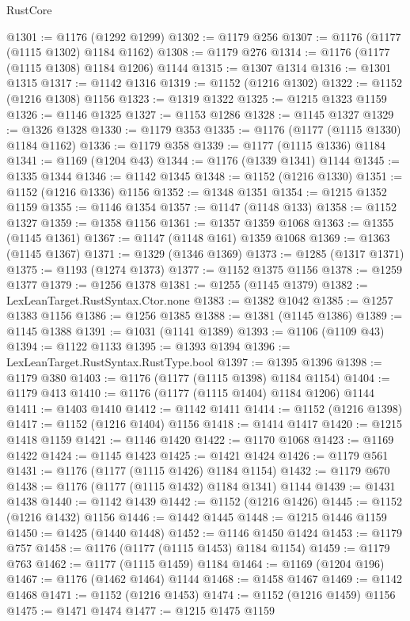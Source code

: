 \begin{lexlean}{RustCore}
\begin{coremodule}
@1301 := @1176 (@1292 @1299)
@1302 := @1179 @256
@1307 := @1176 (@1177 (@1115 @1302) @1184 @1162)
@1308 := @1179 @276
@1314 := @1176 (@1177 (@1115 @1308) @1184 @1206) @1144
@1315 := @1307 @1314
@1316 := @1301 @1315
@1317 := @1142 @1316
@1319 := @1152 (@1216 @1302)
@1322 := @1152 (@1216 @1308) @1156
@1323 := @1319 @1322
@1325 := @1215 @1323 @1159
@1326 := @1146 @1325
@1327 := @1153 @1286
@1328 := @1145 @1327
@1329 := @1326 @1328
@1330 := @1179 @353
@1335 := @1176 (@1177 (@1115 @1330) @1184 @1162)
@1336 := @1179 @358
@1339 := @1177 (@1115 @1336) @1184
@1341 := @1169 (@1204 @43)
@1344 := @1176 (@1339 @1341) @1144
@1345 := @1335 @1344
@1346 := @1142 @1345
@1348 := @1152 (@1216 @1330)
@1351 := @1152 (@1216 @1336) @1156
@1352 := @1348 @1351
@1354 := @1215 @1352 @1159
@1355 := @1146 @1354
@1357 := @1147 (@1148 @133)
@1358 := @1152 @1327
@1359 := @1358 @1156
@1361 := @1357 @1359 @1068
@1363 := @1355 (@1145 @1361)
@1367 := @1147 (@1148 @161) @1359 @1068
@1369 := @1363 (@1145 @1367)
@1371 := @1329 (@1346 @1369)
@1373 := @1285 (@1317 @1371)
@1375 := @1193 (@1274 @1373)
@1377 := @1152 @1375 @1156
@1378 := @1259 @1377
@1379 := @1256 @1378
@1381 := @1255 (@1145 @1379)
@1382 := LexLeanTarget.RustSyntax.Ctor.none
@1383 := @1382 @1042
@1385 := @1257 @1383 @1156
@1386 := @1256 @1385
@1388 := @1381 (@1145 @1386)
@1389 := @1145 @1388
@1391 := @1031 (@1141 @1389)
@1393 := @1106 (@1109 @43)
@1394 := @1122 @1133
@1395 := @1393 @1394
@1396 := LexLeanTarget.RustSyntax.RustType.bool
@1397 := @1395 @1396
@1398 := @1179 @380
@1403 := @1176 (@1177 (@1115 @1398) @1184 @1154)
@1404 := @1179 @413
@1410 := @1176 (@1177 (@1115 @1404) @1184 @1206) @1144
@1411 := @1403 @1410
@1412 := @1142 @1411
@1414 := @1152 (@1216 @1398)
@1417 := @1152 (@1216 @1404) @1156
@1418 := @1414 @1417
@1420 := @1215 @1418 @1159
@1421 := @1146 @1420
@1422 := @1170 @1068
@1423 := @1169 @1422
@1424 := @1145 @1423
@1425 := @1421 @1424
@1426 := @1179 @561
@1431 := @1176 (@1177 (@1115 @1426) @1184 @1154)
@1432 := @1179 @670
@1438 := @1176 (@1177 (@1115 @1432) @1184 @1341) @1144
@1439 := @1431 @1438
@1440 := @1142 @1439
@1442 := @1152 (@1216 @1426)
@1445 := @1152 (@1216 @1432) @1156
@1446 := @1442 @1445
@1448 := @1215 @1446 @1159
@1450 := @1425 (@1440 @1448)
@1452 := @1146 @1450 @1424
@1453 := @1179 @757
@1458 := @1176 (@1177 (@1115 @1453) @1184 @1154)
@1459 := @1179 @763
@1462 := @1177 (@1115 @1459) @1184
@1464 := @1169 (@1204 @196)
@1467 := @1176 (@1462 @1464) @1144
@1468 := @1458 @1467
@1469 := @1142 @1468
@1471 := @1152 (@1216 @1453)
@1474 := @1152 (@1216 @1459) @1156
@1475 := @1471 @1474
@1477 := @1215 @1475 @1159

\end{coremodule}
\end{lexlean}
